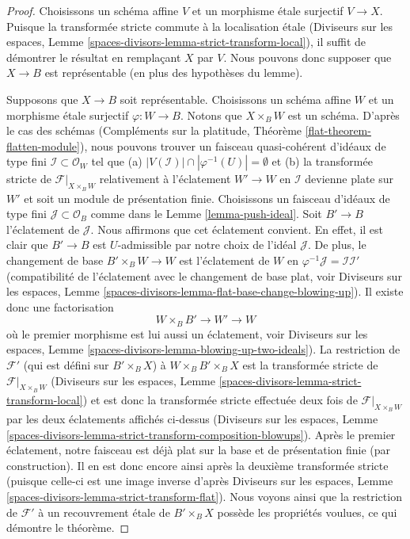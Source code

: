 \begin{proof}
Choisissons un schéma affine $V$ et un morphisme étale surjectif $V \to X$.
Puisque la transformée stricte commute à la localisation étale
(Diviseurs sur les espaces, Lemme \ref{spaces-divisors-lemma-strict-transform-local}),
il suffit de démontrer le résultat en remplaçant $X$ par $V$. Nous pouvons donc
supposer que $X \to B$ est représentable (en plus des
hypothèses du lemme).

\medskip\noindent
Supposons que $X \to B$ soit représentable. Choisissons un schéma affine $W$ et un
morphisme étale surjectif $\varphi : W \to B$. Notons que $X \times_B W$
est un schéma. D'après le cas des schémas
(Compléments sur la platitude, Théorème \ref{flat-theorem-flatten-module}),
nous pouvons trouver un faisceau quasi-cohérent d'idéaux de type fini
$\mathcal{I} \subset \mathcal{O}_W$ tel que
(a) $|V(\mathcal{I})| \cap |\varphi^{-1}(U)| = \emptyset$ et (b)
la transformée stricte de $\mathcal{F}|_{X \times_B W}$ relativement
à l'éclatement $W' \to W$ en $\mathcal{I}$ devienne plate sur $W'$
et soit un module de présentation finie. Choisissons un faisceau d'idéaux de type fini
$\mathcal{J} \subset \mathcal{O}_B$ comme dans le Lemme \ref{lemma-push-ideal}.
Soit $B' \to B$ l'éclatement de $\mathcal{J}$. Nous affirmons que cet
éclatement convient. En effet, il est clair que $B' \to B$ est $U$-admissible
par notre choix de l'idéal $\mathcal{J}$. De plus, le changement de base
$B' \times_B W \to W$ est l'éclatement de $W$ en
$\varphi^{-1}\mathcal{J} = \mathcal{I}\mathcal{I}'$
(compatibilité de l'éclatement avec le changement de base plat, voir
Diviseurs sur les espaces, Lemme
\ref{spaces-divisors-lemma-flat-base-change-blowing-up}).
Il existe donc une factorisation
$$
W \times_B B' \to W' \to W
$$
où le premier morphisme est lui aussi un éclatement, voir
Diviseurs sur les espaces, Lemme \ref{spaces-divisors-lemma-blowing-up-two-ideals}).
La restriction de $\mathcal{F}'$ (qui est défini sur $B' \times_B X$)
à $W \times_B B' \times_B X$ est la transformée stricte de
$\mathcal{F}|_{X \times_B W}$
(Diviseurs sur les espaces, Lemme \ref{spaces-divisors-lemma-strict-transform-local})
et est donc la transformée stricte effectuée deux fois de
$\mathcal{F}|_{X \times_B W}$ par les deux éclatements affichés ci-dessus
(Diviseurs sur les espaces, Lemme
\ref{spaces-divisors-lemma-strict-transform-composition-blowups}).
Après le premier éclatement, notre faisceau est déjà plat sur
la base et de présentation finie (par construction). Il en est donc encore ainsi 
après la deuxième transformée stricte (puisque celle-ci est une
image inverse d'après Diviseurs sur les espaces, Lemme
\ref{spaces-divisors-lemma-strict-transform-flat}).
Nous voyons ainsi que la restriction de $\mathcal{F}'$
à un recouvrement étale de $B' \times_B X$ possède les propriétés voulues,
ce qui démontre le théorème.
\end{proof}







